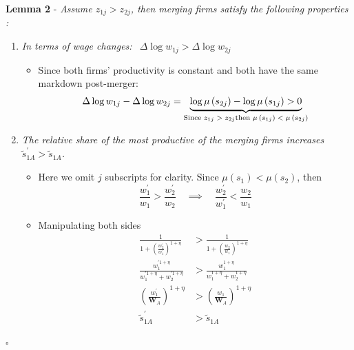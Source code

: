 \documentclass[12pt]{article}
\theoremstyle{prop}
\begin{document}
\textbf{Lemma 2 }- \emph{Assume  ${z_{1j}>z_{2j}}$, then merging firms satisfy the following properties :}
\begin{enumerate}
	\item \emph{In terms of wage changes:  $\ \ \Delta\log w_{1j}>\Delta\log w_{2j}$}
	\begin{itemize}
		\item Since both firms' productivity is constant and both have the same
		markdown post-merger:
		\[
		\Delta\log w_{1j}-\Delta\log w_{2j}=\underbrace{\log\mu\left(s_{2j}\right)-\log\mu\left(s_{1j}\right)>0}_{\text{Since \ensuremath{z_{1j}>z_{2j}}then \ensuremath{\mu\left(s_{1j}\right)<\mu\left(s_{2j}\right)}}}
		\]
	\end{itemize}
	\item \emph{The relative share of the most productive of the merging firms
		increases $\widetilde{s}_{1A}^{\prime}>\widetilde{s}_{1A}$.}
	\begin{itemize}
		\item Here we omit $j$ subscripts for clarity. Since $\mu\left(s_{1}\right)<\mu\left(s_{2}\right)$, then
		\[
		\frac{w_{1}^{\prime}}{w_{1}}>\frac{w_{2}^{\prime}}{w_{2}}\quad\implies\quad\frac{w_{2}^{\prime}}{w_{1}^{\prime}}<\frac{w_{2}}{w_{1}}
		\]
		\item Manipulating both sides
		\begin{align*}
			\frac{1}{1+\left(\frac{w_{2}^{\prime}}{w_{1}^{\prime}}\right)^{1+\eta}} & >\frac{1}{1+\left(\frac{w_{2}}{w_{1}}\right)^{1+\eta}}\\
			\frac{w_{1}^{\prime1+\eta}}{w_{1}^{\prime1+\eta}+w_{2}^{\prime1+\eta}} & >\frac{w_{1}^{1+\eta}}{w_{1}^{1+\eta}+w_{2}^{1+\eta}}\\
			\left(\frac{w_{1}^{\prime}}{\mathbf{W}_{A}}\right)^{1+\eta} & >\left(\frac{w_{1}}{\mathbf{W}_{A}}\right)^{1+\eta}\\
			\widetilde{s}_{1A}^{\prime} & >\widetilde{s}_{1A}
		\end{align*}
	\end{itemize}
\end{enumerate}
 \begin{flushright}
      $\square$
 \end{flushright}
\bigskip
\end{document}
